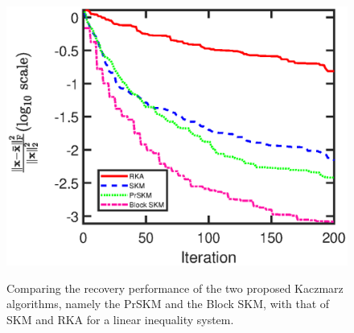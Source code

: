 \documentclass[12pt,draftcls,onecolumn]{IEEEtran}
\begin{document}
\begin{figure}[t]
	\centering
		{\includegraphics[width=0.47\columnwidth]{nmse_inequality.eps}}
	\caption{Comparing the 
 recovery performance of the two proposed Kaczmarz algorithms, namely the PrSKM and the Block SKM, with that of SKM and RKA for
 a linear inequality system. 
 \vspace{-15pt}
 }
	\label{figure_1}
\end{figure}
\end{document}

